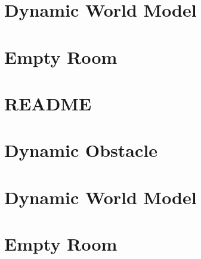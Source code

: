 \let\mypdfximage\pdfximage\def\pdfximage{\immediate\mypdfximage}\documentclass[twoside]{book}
\newcommand{\+}{\discretionary{\mbox{\scriptsize$\hookleftarrow$}}{}{}}
\begin{document}
\chapter{Dynamic World Model}
\label{md_smacc2_sm_reference_library_sm_aws_warehouse_navigation_models_dynamic_world_README}

\chapter{Empty Room}
\label{md_smacc2_sm_reference_library_sm_aws_warehouse_navigation_models_empty_room_README}

\chapter{README}
\label{md_smacc2_sm_reference_library_sm_branching_README}

\chapter{Dynamic Obstacle}
\label{md_smacc2_sm_reference_library_sm_dance_bot_models_dynamic_obstacle_README}

\chapter{Dynamic World Model}
\label{md_smacc2_sm_reference_library_sm_dance_bot_models_dynamic_world_README}

\chapter{Empty Room}
\label{md_smacc2_sm_reference_library_sm_dance_bot_models_empty_room_README}

\end{document}
